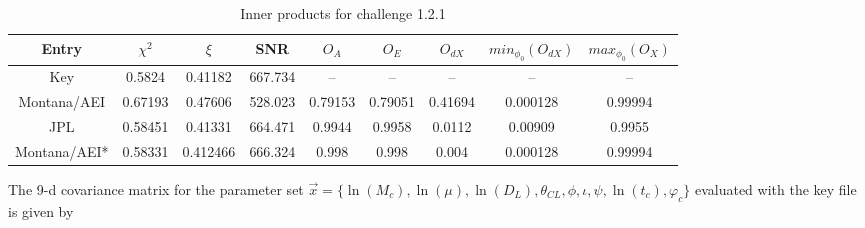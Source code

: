 \documentclass[11pt]{article}
\begin{document}
\begin{table}
\caption{\label{OlapsTable1.2.1} Inner products for challenge 1.2.1}
\begin{center}
\begin{tabular}{|c|c|c|c|c|c|c|c|c|}
\hline
Entry & $\chi^2$ & $\xi$ & SNR & $O_A$ & $O_E$ & $O_{dX}$ & $min_{\phi_0}(O_{dX})$ & $max_{\phi_0}(O_X)$\\
\hline
Key & 0.5824 & 0.41182 & 667.734 &  -- & -- & -- & -- & -- \\
Montana/AEI & 0.67193 & 0.47606 & 528.023 & 0.79153 & 0.79051 &
0.41694 & 0.000128 & 0.99994\\
JPL & 0.58451 & 0.41331 & 664.471 & 0.9944 & 0.9958 & 0.0112 &  0.00909 & 0.9955\\
Montana/AEI* & 0.58331 & 0.412466 & 666.324 & 0.998 & 0.998 & 0.004 & 0.000128 & 0.99994 \\
\hline
\end{tabular}
\end{center}
\end{table}

The 9-d covariance matrix for the parameter set $\vec{x}=\{\ln(M_{c}), \ln(\mu), \ln(D_{L}), \theta_{CL}, \phi, \iota, \psi, \ln(t_{c}), \varphi_{c}\}$ evaluated with the key file is given by
\end{document}
